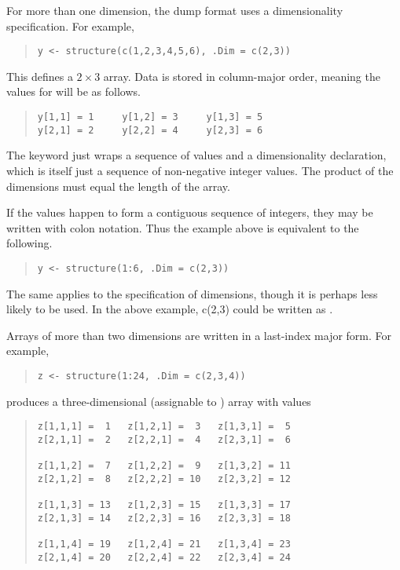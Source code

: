 For more than one dimension, the dump format uses a dimensionality
specification.  For example,
%
\begin{quote}
\begin{verbatim}
y <- structure(c(1,2,3,4,5,6), .Dim = c(2,3))
\end{verbatim}
\end{quote}
%
This defines a $2 \times 3$ array.  Data is stored in column-major
order, meaning the values for  will be as follows.
%
\begin{quote}
\begin{Verbatim}
y[1,1] = 1     y[1,2] = 3     y[1,3] = 5    
y[2,1] = 2     y[2,2] = 4     y[2,3] = 6
\end{Verbatim}
\end{quote}
%
The  keyword just wraps a sequence of values and a
dimensionality declaration, which is itself just a sequence of
non-negative integer values.  The product of the dimensions must equal
the length of the array.

If the values happen to form a contiguous sequence of integers,
they may be written with colon notation.  Thus the example above is
equivalent to the following.
%
\begin{quote}
\begin{verbatim}
y <- structure(1:6, .Dim = c(2,3))
\end{verbatim}
\end{quote}
%
The same applies to the specification of dimensions, though it is
perhaps less likely to be used. In the above example,
c(2,3) could be written as .

Arrays of more than two dimensions are written in a last-index major form.
For example, 
%
\begin{quote}
\begin{verbatim}
z <- structure(1:24, .Dim = c(2,3,4))
\end{verbatim}
\end{quote}
%
produces a three-dimensional  (assignable to )
array  with values
%
\begin{quote}
\begin{verbatim}
z[1,1,1] =  1   z[1,2,1] =  3   z[1,3,1] =  5
z[2,1,1] =  2   z[2,2,1] =  4   z[2,3,1] =  6

z[1,1,2] =  7   z[1,2,2] =  9   z[1,3,2] = 11
z[2,1,2] =  8   z[2,2,2] = 10   z[2,3,2] = 12

z[1,1,3] = 13   z[1,2,3] = 15   z[1,3,3] = 17
z[2,1,3] = 14   z[2,2,3] = 16   z[2,3,3] = 18

z[1,1,4] = 19   z[1,2,4] = 21   z[1,3,4] = 23
z[2,1,4] = 20   z[2,2,4] = 22   z[2,3,4] = 24
\end{verbatim}
\end{quote}

